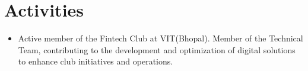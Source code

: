 \documentclass[letterpaper,11pt]{article}
\newcommand{\resumeItem}[1]{
  \item\small{
    {#1 \vspace{-2pt}}
  }
}
\newcommand{\resumeItemListStart}{\begin{itemize}}
\newcommand{\resumeItemListEnd}{\end{itemize}\vspace{-5pt}}
\begin{document}
\section{Activities}
    \resumeItemListStart
        \resumeItem{Active member of the Fintech Club at VIT(Bhopal). Member of the Technical Team, contributing to the development and optimization of digital solutions to enhance club initiatives and operations.}
    \resumeItemListEnd
\end{document}
